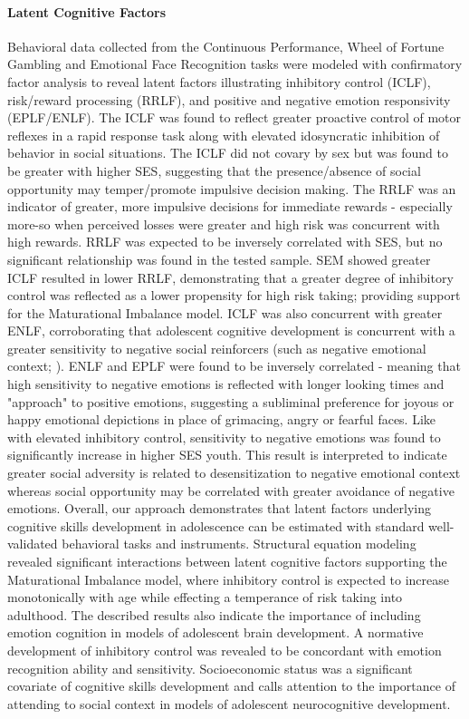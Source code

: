 \documentclass[utf8]{frontiersSCNS} %
\begin{document}
\paragraph*{Latent Cognitive Factors} Behavioral data collected from the Continuous Performance, Wheel of Fortune Gambling and Emotional Face Recognition tasks were modeled with confirmatory factor analysis to reveal latent factors illustrating inhibitory control (ICLF), risk/reward processing (RRLF), and positive and negative emotion responsivity (EPLF/ENLF). The ICLF was found to reflect greater proactive control of motor reflexes in a rapid response task along with elevated idosyncratic inhibition of behavior in social situations. The ICLF did not covary by sex but was found to be greater with higher SES, suggesting that the presence/absence of social opportunity may temper/promote impulsive decision making. The RRLF was an indicator of greater, more impulsive decisions for immediate rewards - especially more-so when perceived losses were greater and high risk was concurrent with high rewards. RRLF was expected to be inversely correlated with SES, but no significant relationship was found in the tested sample. SEM showed greater ICLF resulted in lower RRLF, demonstrating that a greater degree of inhibitory control was reflected as a lower propensity for high risk taking; providing support for the Maturational Imbalance model. ICLF was also concurrent with greater ENLF, corroborating that adolescent cognitive development is concurrent with a greater sensitivity to negative social reinforcers (such as negative emotional context; \cite{jones2014adolescent, rosenbaum2020valence}). ENLF and EPLF were found to be inversely correlated - meaning that high sensitivity to negative emotions is reflected with longer looking times and "approach" to positive emotions, suggesting a subliminal preference for joyous or happy emotional depictions in place of grimacing, angry or fearful faces. Like with elevated inhibitory control, sensitivity to negative emotions was found to significantly increase in higher SES youth. This result is interpreted to indicate greater social adversity is related to desensitization to negative emotional context whereas social opportunity may be correlated with greater avoidance of negative emotions. Overall, our approach demonstrates that latent factors underlying cognitive skills development in adolescence can be estimated with standard well-validated behavioral tasks and instruments. Structural equation modeling revealed significant interactions between latent cognitive factors supporting the Maturational Imbalance model, where inhibitory control is expected to increase monotonically with age while effecting a temperance of risk taking into adulthood. The described results also indicate the importance of including emotion cognition in models of adolescent brain development. A normative development of inhibitory control was revealed to be concordant with emotion recognition ability and sensitivity. Socioeconomic status was a significant covariate of cognitive skills development and calls attention to the importance of attending to social context in models of adolescent neurocognitive development.
\vspace{2pt}
\end{document}
